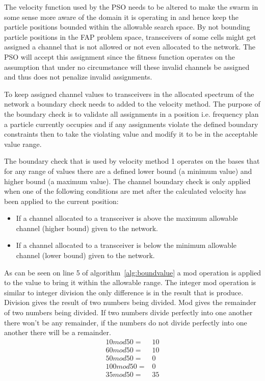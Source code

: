 The velocity function used by the PSO needs to be altered to make the swarm in some sense more aware of the domain it is operating in and hence keep the particle positions bounded within the allowable search space. By not bounding particle positions in the FAP problem space, transceivers of some cells might get assigned a channel that is not allowed or not even allocated to the network. The PSO will accept this assignment since the fitness function operates on the assumption that under no circumstance will these invalid channels be assigned and thus does not penalize invalid assignments.

To keep assigned channel values to transceivers in the allocated spectrum of the network a boundary check needs to added to the velocity method. The purpose of the boundary check is to validate all assignments in a position i.e. frequency plan a particle currently occupies and if any assignments violate the defined boundary constraints then to take the violating value and modify it to be in the acceptable value range.

The boundary check that is used by velocity method 1 operates on the bases that for any range of values there are a defined lower bound (a minimum value) and higher bound (a maximum value). The channel boundary check is only applied when one of the following conditions are met after the calculated velocity has been applied to the current position:
\begin{itemize}
\item If a channel allocated to a transceiver is above the maximum allowable channel (higher bound) given to the network. 
\item If a channel allocated to a transceiver is below the minimum allowable channel (lower bound) given to the network.
\end{itemize}

As can be seen on line 5 of algorithm~\ref{alg:boundvalue} a mod operation is applied to the value to bring it within the allowable range. The integer mod operation is similar to integer division the only difference is in the result that is produce. Division gives the result of two numbers being divided. Mod gives the remainder of two numbers being divided. If two numbers divide perfectly into one another there won't be any remainder, if the numbers do not divide perfectly into one another there will be a remainder. 
\begin{align}
	10 mod 50 =& 10 \\
	60 mod 50 =& 10 \\
	50 mod 50 =& 0 \\
	100 mod 50 =& 0 \\
	35 mod 50 =& 35 
\end{align}

